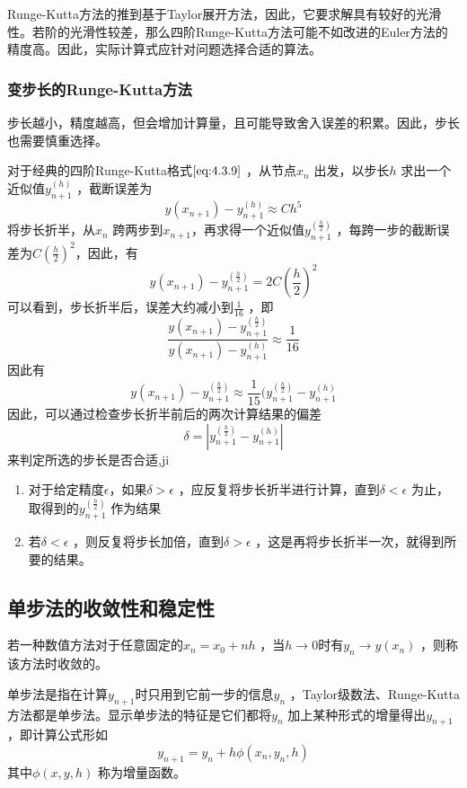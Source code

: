 \documentclass[a4paper]{article}
\begin{document}
Runge-Kutta方法的推到基于Taylor展开方法，因此，它要求解具有较好的光滑性。若阶的光滑性较差，那么四阶Runge-Kutta方法可能不如改进的Euler方法的精度高。因此，实际计算式应针对问题选择合适的算法。

\subsubsection{变步长的Runge-Kutta方法}
步长越小，精度越高，但会增加计算量，且可能导致舍入误差的积累。因此，步长也需要慎重选择。

对于经典的四阶Runge-Kutta格式$\ref{eq:4.3.9}$ ，从节点$x_{n}$ 出发，以步长$h$ 求出一个近似值$y_{n+1}^{(h)}$ ，截断误差为
\[
y(x_{n+1}) - y_{n+1}^{(h)} \approx C h^{5} \tag{4.3.10} \label{eq:4.3.10} 
\] 
将步长折半，从$x_{n}$ 跨两步到$x_{n+1}$，再求得一个近似值$y_{n+1}^{(\frac{h}{2})}$ ，每跨一步的截断误差为$C \left( \frac{h}{2} \right) ^2$，因此，有
\[
	y(x_{n+1}) - y_{n+1}^{(\frac{h}{2})} = 2 C \left( \frac{h}{2} \right) ^2 \tag{4.3.11} \label{eq:4.3.11} 
\] 
可以看到，步长折半后，误差大约减小到$\frac{1}{16}$ ，即
\[
\frac{y(x_{n+1}) - y_{n+1}^{(\frac{h}{2})}}{y(x_{n+1}) - y_{n+1}^{(h)}} \approx \frac{1}{16}
\] 
因此有
\[
y(x_{n+1}) - y_{n+1}^{(\frac{h}{2})} \approx \frac{1}{15} (y_{n+1}^{(\frac{h}{2})} - y_{n+1}^{(h)}
\] 
因此，可以通过检查步长折半前后的两次计算结果的偏差
\[
\delta = | y_{n+1}^{(\frac{h}{2})} - y_{n+1}^{(h)} |
\] 
来判定所选的步长是否合适,ji 
\begin{enumerate}
	\item 对于给定精度$\epsilon$，如果$\delta > \epsilon$ ，应反复将步长折半进行计算，直到$\delta < \epsilon$ 为止，取得到的$y_{n+1}^{(\frac{h}{2})}$ 作为结果
	\item 若$\delta < \epsilon$ ，则反复将步长加倍，直到$\delta > \epsilon$ ，这是再将步长折半一次，就得到所要的结果。
\end{enumerate}

\subsection{单步法的收敛性和稳定性}
\begin{definition}
若一种数值方法对于任意固定的$x_{n} = x_0 + nh$ ，当$h \to 0$时有$y_{n} \to y(x_{n})$ ，则称该方法时收敛的。 
\end{definition}

单步法是指在计算$y_{n+1}$时只用到它前一步的信息$y_{n}$ ，Taylor级数法、Runge-Kutta方法都是单步法。显示单步法的特征是它们都将$y_{n}$ 加上某种形式的增量得出$y_{n+1}$，即计算公式形如
\[
y_{n+1} = y_{n} + h \phi(x_{n}, y_{n}, h) \tag{4.4.1} \label{eq:4.4.1} 
\] 
其中$\phi(x,y,h)$ 称为增量函数。
\end{document}
